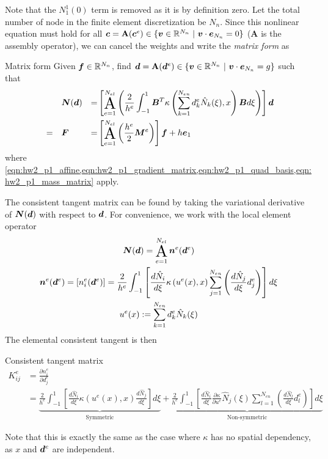 Note that the $N_1^1(0)$ term is removed as it is by definition zero. 
Let the total number of node in the finite element discretization be $N_n$. 
Since this nonlinear equation must hold for all $\bm{c} = \mathbf{A}(\bm{c}^e) \in \{\bm{v} \in \mathbb{R}^{N_n} ~|~ \bm{v} \cdot \bm{e}_{N_n} = 0\}$ ($\mathbf{A}$ is the assembly operator), we can cancel the weights and write the \emph{matrix form} as 
\begin{codenv}{Matrix form}
    Given $\bm{f} \in \mathbb{R}^{N_n}$, find $\bm{d} = \mathbf{A}(\bm{d}^e) \in \{\bm{v} \in \mathbb{R}^{N_n} ~|~ \bm{v} \cdot \bm{e}_{N_n} = g\}$ such that 
    \begin{equation}
    \begin{aligned}
        &&& \bt{N}(\bv{d}) &= &\left[\assem_{e=1}^{N_{el}} \left( \frac{2}{h^e} \int_{-1}^1 \bt{B}^T \kappa\left(\sum_{k=1}^{N_{en}} d_k^e \hat{N}_k(\xi), x\right) \bt{B} d\xi\right) \right] \bv{d} \\
        &=&& \bt{F} &= &\left[\assem_{e=1}^{N_{el}} \left(\frac{h^e}{2} \bt{M}^e \right)\right] \bv{f} + h\bv{e}_1
    \end{aligned}
    \end{equation}
    where \cref{eqn:hw2_p1_affine,eqn:hw2_p1_gradient_matrix,eqn:hw2_p1_quad_basis,eqn:hw2_p1_mass_matrix} apply.
\end{codenv}

The consistent tangent matrix can be found by taking the variational derivative of $\bm{N}(\bm{d})$ with respect to $\bm{d}$. 
For convenience, we work with the local element operator 
\begin{equation}
\begin{gathered}
    \bv{N}(\bv{d}) = \assem_{e=1}^{N_{el}} \bv{n}^e(\bv{d}^e) \\
    \bv{n}^e(\bv{d}^e) = [n_i^e(\bv{d}^e)] = \frac{2}{h^e} \int_{-1}^1 \left[
        \frac{d\hat{N}_i}{d\xi} \kappa\left(u^e(x), x\right) \sum_{j=1}^{N_{en}} \left(\frac{d\hat{N}_j}{d\xi} d_j^e\right)
    \right]d\xi \\
    u^e(x):= \sum_{k=1}^{N_{en}} d_k^e \hat{N}_k(\xi)
\end{gathered}
\end{equation}
The elemental consistent tangent is then 
\begin{codenv}{Consistent tangent matrix}
\begin{equation}
\begin{aligned}
    K_{ij}^e &= \frac{\partial n_i^e}{\partial d_j^e} \\
    &= \underbrace{\frac{2}{h^e}\int_{-1}^1 \left[
        \frac{d\hat{N}_i}{d\xi} \kappa\left(u^e(x), x\right) \frac{d\hat{N}_j}{d\xi}
    \right]d\xi}_{\textrm{Symmetric}} + 
    \underbrace{\frac{2}{h^e}\int_{-1}^1 \left[
        \frac{d\hat{N}_i}{d\xi} \frac{\partial \kappa}{\partial u^e} \hat{N}_j(\xi) \sum_{l=1}^{N_{en}} \left(\frac{d\hat{N}_l}{d\xi} d_l^e\right)
    \right]d\xi}_{\textrm{Non-symmetric}}
\end{aligned}
\end{equation}
\end{codenv}
Note that this is exactly the same as the case where $\kappa$ has no spatial dependency, as $x$ and $\bm{d}^e$ are independent.

